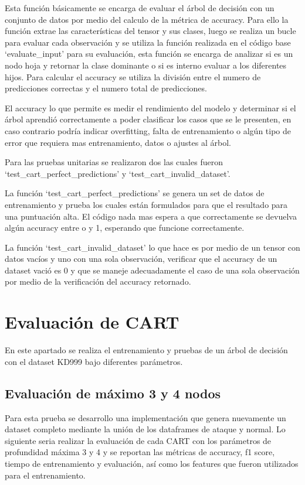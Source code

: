 \documentclass[12pt,a4paper]{article}
\begin{document}
Esta función básicamente se encarga de evaluar el árbol de decisión con un conjunto de datos por medio del calculo de la métrica
de accuracy. Para ello la función extrae las características del tensor y sus clases, luego se realiza un bucle para evaluar cada observación
y se utiliza la función realizada en el código base `evaluate_input' para su evaluación, esta función se encarga de
analizar si es un nodo hoja y retornar la clase dominante o si es interno evaluar a los diferentes hijos.
Para calcular el accuracy se utiliza la división entre el numero de predicciones correctas y el numero total de predicciones.

El accuracy lo que permite es medir el rendimiento del modelo y determinar si el árbol aprendió correctamente a poder clasificar
los casos que se le presenten, en caso contrario podría indicar overfitting, falta de entrenamiento o algún tipo de error que requiera
mas entrenamiento, datos o ajustes al árbol.

Para las pruebas unitarias se realizaron dos las cuales fueron `test_cart_perfect_predictions' y `test_cart_invalid_dataset'.

La función `test_cart_perfect_predictions' se genera un set de datos de entrenamiento y prueba los cuales están formulados para que el resultado
para una puntuación alta. El código nada mas espera a que correctamente se devuelva algún accuracy entre o y 1, esperando que
funcione correctamente.

La función `test_cart_invalid_dataset' lo que hace es por medio de un tensor con datos vacíos y uno con una sola observación,
verificar que el accuracy de un dataset vació es 0 y que se maneje adecuadamente el caso de una sola observación por medio
de la verificación del accuracy retornado.

\section{Evaluación de CART}\label{sec:evaluacion-de-cart}

En este apartado se realiza el entrenamiento y pruebas de un árbol de decisión con el dataset KD999 bajo diferentes parámetros.

\subsection{Evaluación de máximo 3 y 4 nodos}\label{subsec:evaluacion-de-maximo-3-y-4-nodos}

Para esta prueba se desarrollo una implementación que genera nuevamente un dataset completo mediante la unión
de los dataframes de ataque y normal.
Lo siguiente seria realizar la evaluación de cada CART con los parámetros de profundidad máxima
3 y 4 y se reportan las métricas de accuracy, f1 score, tiempo de entrenamiento y evaluación, así como los features que
fueron utilizados para el entrenamiento.
\end{document}
